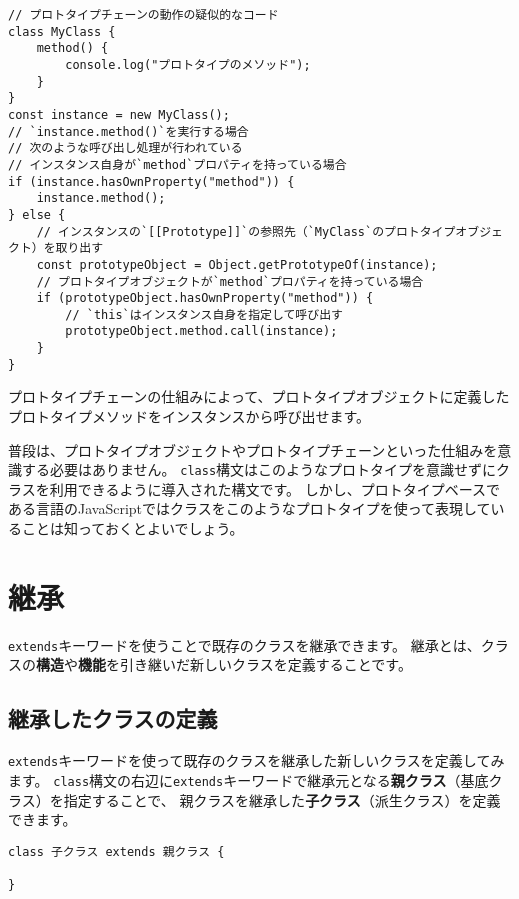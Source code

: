 \begin{lstlisting}
// プロトタイプチェーンの動作の疑似的なコード
class MyClass {
    method() {
        console.log("プロトタイプのメソッド");
    }
}
const instance = new MyClass();
// `instance.method()`を実行する場合
// 次のような呼び出し処理が行われている
// インスタンス自身が`method`プロパティを持っている場合
if (instance.hasOwnProperty("method")) {
    instance.method();
} else {
    // インスタンスの`[[Prototype]]`の参照先（`MyClass`のプロトタイプオブジェクト）を取り出す
    const prototypeObject = Object.getPrototypeOf(instance);
    // プロトタイプオブジェクトが`method`プロパティを持っている場合
    if (prototypeObject.hasOwnProperty("method")) {
        // `this`はインスタンス自身を指定して呼び出す
        prototypeObject.method.call(instance);
    }
}
\end{lstlisting}

プロトタイプチェーンの仕組みによって、プロトタイプオブジェクトに定義したプロトタイプメソッドをインスタンスから呼び出せます。

普段は、プロトタイプオブジェクトやプロトタイプチェーンといった仕組みを意識する必要はありません。
\texttt{class}構文はこのようなプロトタイプを意識せずにクラスを利用できるように導入された構文です。
しかし、プロトタイプベースである言語のJavaScriptではクラスをこのようなプロトタイプを使って表現していることは知っておくとよいでしょう。

\hypertarget{extends}{%
\section{継承}\label{extends}}

\texttt{extends}キーワードを使うことで既存のクラスを継承できます。
継承とは、クラスの\textbf{構造}や\textbf{機能}を引き継いだ新しいクラスを定義することです。

\hypertarget{class-extends}{%
\subsection{継承したクラスの定義}\label{class-extends}}

\texttt{extends}キーワードを使って既存のクラスを継承した新しいクラスを定義してみます。
\texttt{class}構文の右辺に\texttt{extends}キーワードで継承元となる\textbf{親クラス}（基底クラス）を指定することで、
親クラスを継承した\textbf{子クラス}（派生クラス）を定義できます。

\begin{lstlisting}
class 子クラス extends 親クラス {

}
\end{lstlisting}

